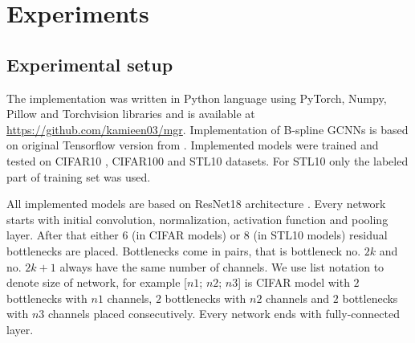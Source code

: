 \section{Experiments}
\subsection{Experimental setup}
The implementation was written in Python language using
PyTorch, Numpy, Pillow and Torchvision libraries
and is available at
\url{https://github.com/kamieen03/mgr}.
Implementation
of B-spline GCNNs is based on original Tensorflow version from
\cite{bekkers2019}.
Implemented models were trained and tested on CIFAR10 \cite{cifar},
CIFAR100 \cite{cifar} and STL10 \cite{stl10} datasets.
For STL10 only the labeled part of training set was used.

All implemented models are based on ResNet18 architecture \cite{resnet}.
Every network starts with initial convolution, normalization, activation
function and pooling layer. After that either $6$ (in CIFAR models)
or $8$ (in STL10 models) residual bottlenecks are
placed. Bottlenecks come in pairs, that is bottleneck no. $2k$ and no. $2k+1$
always have the same number of channels. We use list notation to denote size of
network, for example [$\mathit{n1}$; $\mathit{n2}$; $\mathit{n3}$]
is CIFAR model with $2$ bottlenecks with $n1$ channels, $2$ bottlenecks with
$n2$ channels and $2$ bottlenecks with $n3$ channels placed consecutively.
Every network ends with fully-connected layer.

